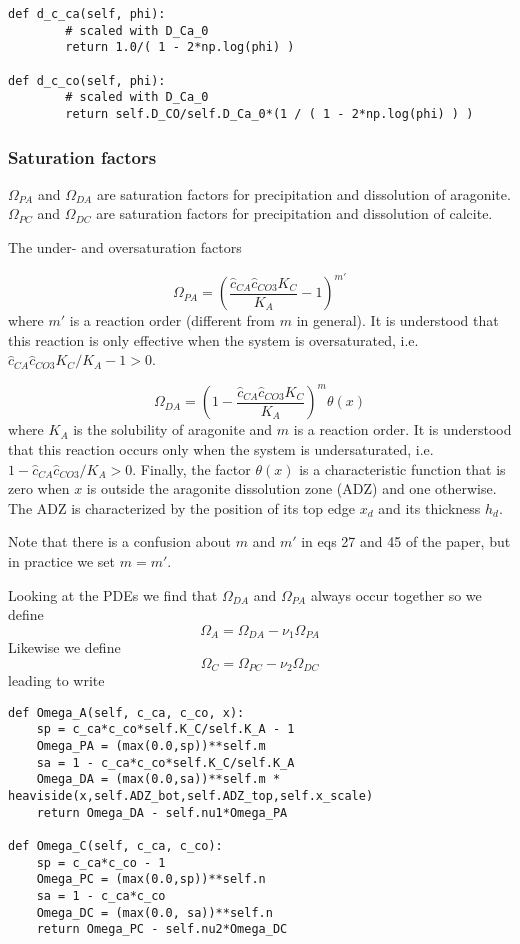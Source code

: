 \documentclass[a4paper]{article}
\begin{document}
\begin{lstlisting}
def d_c_ca(self, phi):
        # scaled with D_Ca_0
        return 1.0/( 1 - 2*np.log(phi) )

def d_c_co(self, phi):
        # scaled with D_Ca_0
        return self.D_CO/self.D_Ca_0*(1 / ( 1 - 2*np.log(phi) ) )
\end{lstlisting}




\subsubsection*{Saturation factors}

$\Omega_{PA}$ and $\Omega_{DA}$ are saturation factors for precipitation 
and dissolution of aragonite. 
$\Omega_{PC}$ and $\Omega_{DC}$ are saturation factors for precipitation 
and dissolution of calcite.

The under- and oversaturation factors 

\[
\Omega_{PA}=\left( \frac{\hat{c}_{CA} \hat{c}_{CO3} K_C}{K_A} -1 \right)^{m'}
\]
where $m'$ is a reaction order (different from $m$ in general).
It is understood that this reaction is only effective when the
system is oversaturated, i.e. $\hat{c}_{CA} \hat{c}_{CO3} K_C/K_A -1 >0$.

\[
\Omega_{DA}= \left(1-\frac{\hat{c}_{CA} \hat{c}_{CO3} K_C}{K_A}  \right)^m \theta(x)
\]
where $K_A$ is the solubility of aragonite and $m$ is a reaction
order. It is understood that this reaction occurs only when
the system is undersaturated,
i.e. $1-\hat{c}_{CA} \hat{c}_{CO3}/K_A >0$.
Finally,
the factor $\theta(x)$ is a characteristic function that is zero when
$x$ is outside the aragonite dissolution zone (ADZ) and one
otherwise. The ADZ is characterized by the position of its top
edge $x_d$ and its thickness $h_d$.

Note that there is a confusion about $m$ and $m'$
in eqs 27 and 45 of the paper, but in practice we set $m=m'$.

Looking at the PDEs we find that $\Omega_{DA}$ and $\Omega_{PA}$
always occur together so we define
\[
\Omega_A=\Omega_{DA}-\nu_1\Omega_{PA} 
\]
Likewise we define
\[
\Omega_C=\Omega_{PC}-\nu_2\Omega_{DC}
\]
leading to write

\begin{lstlisting}
def Omega_A(self, c_ca, c_co, x):
    sp = c_ca*c_co*self.K_C/self.K_A - 1
    Omega_PA = (max(0.0,sp))**self.m
    sa = 1 - c_ca*c_co*self.K_C/self.K_A
    Omega_DA = (max(0.0,sa))**self.m * heaviside(x,self.ADZ_bot,self.ADZ_top,self.x_scale)
    return Omega_DA - self.nu1*Omega_PA

def Omega_C(self, c_ca, c_co):
    sp = c_ca*c_co - 1
    Omega_PC = (max(0.0,sp))**self.n
    sa = 1 - c_ca*c_co
    Omega_DC = (max(0.0, sa))**self.n
    return Omega_PC - self.nu2*Omega_DC
\end{lstlisting}
\end{document}
